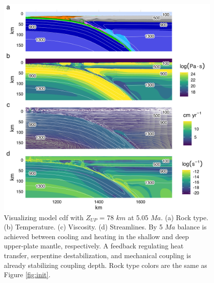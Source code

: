 \begin{figure}[htbp]

{\centering \includegraphics[width=1\linewidth,]{assets/figs/chpt2/figA3} 

}

\caption[Results for model cdf with $Z_{UP}$ = 78 $km$ at 5.05 $Ma$]{Visualizing model cdf with $Z_{UP}$ = 78 $km$ at 5.05 $Ma$. (a) Rock type. (b) Temperature. (c) Viscosity. (d) Streamlines. By 5 $Ma$ balance is achieved between cooling and heating in the shallow and deep upper-plate mantle, respectively. A feedback regulating heat transfer, serpentine destabilization, and mechanical coupling is already stabilizing coupling depth. Rock type colors are the same as Figure \ref{fig:init}.}\label{fig:cdfStep2}
\end{figure}

